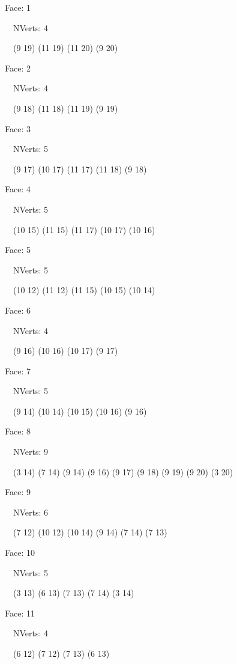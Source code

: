 \documentclass{article}
\begin{document}
{\footnotesize 

Face: 1

\   \    NVerts: 4

 \   \   (9 19) (11 19) (11 20) (9 20)}

{\footnotesize 

Face: 2

\   \    NVerts: 4

 \   \   (9 18) (11 18) (11 19) (9 19)}

{\footnotesize 

Face: 3

\   \    NVerts: 5

 \   \   (9 17) (10 17) (11 17) (11 18) (9 18)}

{\footnotesize 

Face: 4

\   \    NVerts: 5

 \   \   (10 15) (11 15) (11 17) (10 17) (10 16)}

{\footnotesize 

Face: 5

\   \    NVerts: 5

 \   \   (10 12) (11 12) (11 15) (10 15) (10 14)}

{\footnotesize 

Face: 6

\   \    NVerts: 4

 \   \   (9 16) (10 16) (10 17) (9 17)}

{\footnotesize 

Face: 7

\   \    NVerts: 5

 \   \   (9 14) (10 14) (10 15) (10 16) (9 16)}

{\footnotesize 

Face: 8

\   \    NVerts: 9

 \   \   (3 14) (7 14) (9 14) (9 16) (9 17) (9 18) (9 19) (9 20) (3 20)}

{\footnotesize 

Face: 9

\   \    NVerts: 6

 \   \   (7 12) (10 12) (10 14) (9 14) (7 14) (7 13)}

{\footnotesize 

Face: 10

\   \    NVerts: 5

 \   \   (3 13) (6 13) (7 13) (7 14) (3 14)}

{\footnotesize 

Face: 11

\   \    NVerts: 4

 \   \   (6 12) (7 12) (7 13) (6 13)}
\end{document}
